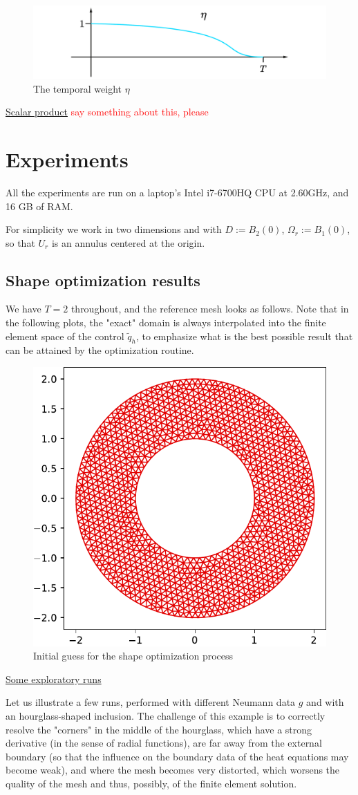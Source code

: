 \documentclass[english,a4paper,9pt,oneside]{scrbook}	%
\theoremstyle{break}
\theoremstyle{remark}
\newcommand{\tred}[1]{\textcolor{red}{#1}}
\begin{document}
\begin{figure}[H]
\centering
\includegraphics[width=0.5\columnwidth]{Images/Eta.pdf}
\caption{The temporal weight $\eta$}\label{fig:eta}
\end{figure}

\underline{Scalar product}
\tred{say something about this, please}

\section{Experiments}
\label{sec:experiments}

All the experiments are run on a laptop's Intel i7-6700HQ CPU at 2.60GHz, and 16 GB of RAM.

For simplicity we work in two dimensions and with $D:=B_2(0)$, $\Omega_r := B_{1}(0)$, so that $U_r$ is an annulus centered at the origin. 

\subsection{Shape optimization results}

We have $T=2$ throughout, and the reference mesh looks as follows. Note that in the following plots, the "exact" domain is always interpolated into the finite element space of the control $\tilde{q}_h$, to emphasize what is the best possible result that can be attained by the optimization routine.

\begin{figure}[H]
\centering
\includegraphics[width=0.3\columnwidth]{Images/hourglass_constant/initial_domain.pdf}
\caption{Initial guess for the shape optimization process}\label{fig:initial_domain}
\end{figure}

\underline{Some exploratory runs}

Let us illustrate a few runs, performed with different Neumann data $g$ and with an hourglass-shaped inclusion. The challenge of this example is to correctly resolve the "corners" in the middle of the hourglass, which have a strong derivative (in the sense of radial functions), are far away from the external boundary (so that the influence on the boundary data of the heat equations may become weak), and where the mesh becomes very distorted, which worsens the quality of the mesh and thus, possibly, of the finite element solution.
\end{document}
